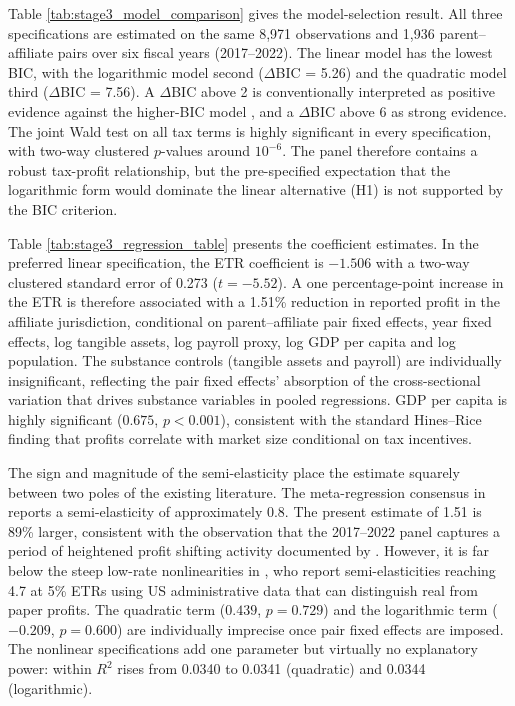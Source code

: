 \documentclass[11pt,a4paper]{article}
\begin{document}
Table \ref{tab:stage3_model_comparison} gives the model-selection result. All three specifications are estimated on the same 8{,}971 observations and 1{,}936 parent--affiliate pairs over six fiscal years (2017--2022). The linear model has the lowest BIC, with the logarithmic model second ($\Delta$BIC = 5.26) and the quadratic model third ($\Delta$BIC = 7.56). A $\Delta$BIC above 2 is conventionally interpreted as positive evidence against the higher-BIC model \citep{raftery1995}, and a $\Delta$BIC above 6 as strong evidence. The joint Wald test on all tax terms is highly significant in every specification, with two-way clustered $p$-values around $10^{-6}$. The panel therefore contains a robust tax-profit relationship, but the pre-specified expectation that the logarithmic form would dominate the linear alternative (H1) is not supported by the BIC criterion.



Table \ref{tab:stage3_regression_table} presents the coefficient estimates. In the preferred linear specification, the ETR coefficient is $-1.506$ with a two-way clustered standard error of 0.273 ($t = -5.52$). A one percentage-point increase in the ETR is therefore associated with a 1.51\% reduction in reported profit in the affiliate jurisdiction, conditional on parent--affiliate pair fixed effects, year fixed effects, log tangible assets, log payroll proxy, log GDP per capita and log population. The substance controls (tangible assets and payroll) are individually insignificant, reflecting the pair fixed effects' absorption of the cross-sectional variation that drives substance variables in pooled regressions. GDP per capita is highly significant ($0.675$, $p < 0.001$), consistent with the standard Hines--Rice finding that profits correlate with market size conditional on tax incentives.

The sign and magnitude of the semi-elasticity place the estimate squarely between two poles of the existing literature. The meta-regression consensus in \citet{heckemeyer2017} reports a semi-elasticity of approximately 0.8. The present estimate of 1.51 is 89\% larger, consistent with the observation that the 2017--2022 panel captures a period of heightened profit shifting activity documented by \citet{garcia-bernardo2022a}. However, it is far below the steep low-rate nonlinearities in \citet{dowd2017}, who report semi-elasticities reaching 4.7 at 5\% ETRs using US administrative data that can distinguish real from paper profits. The quadratic term ($0.439$, $p = 0.729$) and the logarithmic term ($-0.209$, $p = 0.600$) are individually imprecise once pair fixed effects are imposed. The nonlinear specifications add one parameter but virtually no explanatory power: within $R^2$ rises from 0.0340 to 0.0341 (quadratic) and 0.0344 (logarithmic).
\end{document}

